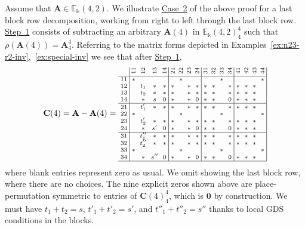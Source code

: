 \documentclass[ALCO,ThmDefs,Unicode,epreuves]{cedram}
\newcommand{\E}{\mathbb{E}}
\newcommand{\bA}{\mathbf{A}}
\newcommand{\bC}{\mathbf{C}}
\newcommand{\bzero}{\mathbf{0}}
\newcommand{\rt}[1]{\rotatebox{90}{#1}}
\begin{document}
 

\begin{exam}\label{ex:decomp42}
Assume that $\bA \in \E_\Bbbk(4,2)$. We illustrate \hyperlink{Case 2}{Case~2} of the above
proof for a last block row decomposition, working from right to left
through the last block row. \hyperlink{Step 1}{Step~1} consists of subtracting an
arbitrary $\bA(4)$ in $\E_\Bbbk(4,2)^4_4$ such that
$\rho(\bA(4))=\bA^4_4$. Referring to the matrix forms depicted in
Examples~\ref{ex:n23-r2-inv},~\ref{ex:special-inv} we see that after
\hyperlink{Step 1}{Step~1},
\[
\bC(4) = \bA - \bA(4) = 
\text{\setlength{\arraycolsep}{2.7pt}\scriptsize
$\displaystyle 
\begin{array}{c|cccc|cccc|cccc|cccc|}
 &\rt{11}&\rt{12}&\rt{13}&\rt{14}&\rt{21}&\rt{22}&\rt{23}&\rt{24}&
 \rt{31}&\rt{32}&\rt{33}&\rt{34}&\rt{41}&\rt{42}&\rt{43}&\rt{44}\\ \hline
 11&*& & & & &*& & & & &*& & & & &*\\
 12& &t_1&*&*&*& &*&*&*&*& &*&*&*&* & \\
 13& &t_2&*&*&*& &*&*&*&*& &*&*&*&*& \\
 14& &*&s&0&*& &*&0&*&*& &0&*&*&*& \\ \hline
 21& &t'_1&*&*&*& &*&*&*&*& &*&*&*&*& \\ 
 22&*& & & & &*& & & & &*& & & & &*\\
 23& &t'_2&*&*&*& &*&*&*&*& &*&*&*&*& \\ 
 24& &*&s'&0&*& &*&0&*&*& &0&*&*&*& \\ \hline 
 31& &t''_1&*&*&*& &*&*&*&*& &*&*&*&*& \\
 32& &t''_2&*&*&*& &*&*&*&*& &*&*&*&*& \\
 33&*& & & & &*& & & & &*& & & & &*\\ 
 34& &*&s''&0&*& &*&0&*&*& &0&*&*&*& \\ \hline
\end{array} $}
\]
where blank entries represent zero as usual. We omit showing the last
block row, where there are no choices. The nine explicit zeros shown
above are place-permutation symmetric to entries of $\bC(4)^4_4$,
which is $\bzero$ by construction. We must have $t_1+t_2 = s$,
$t'_1+t'_2 = s'$, and $t''_1+t''_2 = s''$ thanks to local GDS
conditions in the blocks.


\end{exam}
\end{document}
